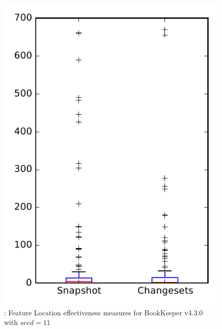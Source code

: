 
\begin{figure}
\centering
\includegraphics[height=0.4\textheight]{figures/flt_seed/rq1_bookkeeper_11}
\caption{\rone: Feature Location effectiveness measures for BookKeeper v4.3.0 with $seed=11$}
\label{fig:flt_seed:rq1:bookkeeper}
\end{figure}
